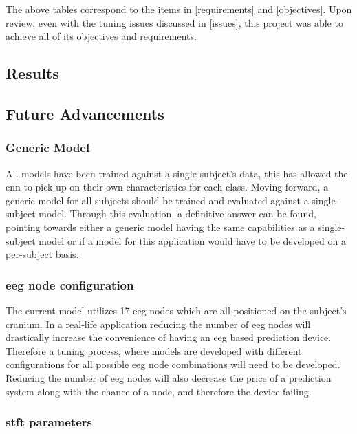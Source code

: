 \documentclass[12pt]{article}
\begin{document}
The above tables correspond to the items in \ref{requirements} and \ref{objectives}. Upon review, even with the tuning issues discussed in \ref{issues}, this project was able to achieve all of its objectives and requirements.

\subsection{Results}\label{results}




\subsection{Future Advancements}


\subsubsection{Generic Model}

All models have been trained against a single subject's data, this has allowed the \acrshort{cnn} to pick up on their own characteristics for each class. Moving forward, a generic model for all subjects should be trained and evaluated against a single-subject model. Through this evaluation, a definitive answer can be found, pointing towards either a generic model having the same capabilities as a single-subject model or if a model for this application would have to be developed on a per-subject basis.

\subsubsection{\acrshort{eeg} node configuration}

The current model utilizes 17 \acrshort{eeg} nodes which are all positioned on the subject's cranium. In a real-life application reducing the number of \acrshort{eeg} nodes will drastically increase the convenience of having an \acrshort{eeg} based prediction device. Therefore a tuning process, where models are developed with different configurations for all possible \acrshort{eeg} node combinations will need to be developed. Reducing the number of \acrshort{eeg} nodes will also decrease the price of a prediction system along with the chance of a node, and therefore the device failing.

\subsubsection{\acrshort{stft} parameters}
\end{document}
